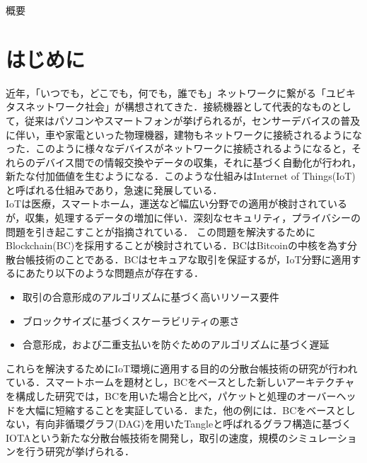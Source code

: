 \documentclass{kuisthesis}			%
\date{平成30年2月1日}				%
\begin{document}
\maketitle

\begin{jabstract}
概要
\end{jabstract}


\tableofcontents

\section{はじめに}\label{sec-intro}

近年，「いつでも，どこでも，何でも，誰でも」ネットワークに繋がる「ユビキタスネットワーク社会」が構想されてきた．接続機器として代表的なものとして，従来はパソコンやスマートフォンが挙げられるが，センサーデバイスの普及に伴い，車や家電といった物理機器，建物もネットワークに接続されるようになった．このように様々なデバイスがネットワークに接続されるようになると，それらのデバイス間での情報交換やデータの収集，それに基づく自動化が行われ，新たな付加価値を生むようになる．このような仕組みはInternet of Things(IoT)と呼ばれる仕組みであり，急速に発展している\cite{Atzori2010}\cite{Gubbi2013}．\\
IoTは医療，スマートホーム，運送など幅広い分野での適用が検討されているが，収集，処理するデータの増加に伴い．深刻なセキュリティ，プライバシーの問題を引き起こすことが指摘されている\cite{dorri2017towards}．
この問題を解決するためにBlockchain(BC)を採用することが検討されている．BCはBitcoin\cite{nakamoto2008bitcoin}の中核を為す分散台帳技術のことである．BCはセキュアな取引を保証するが，IoT分野に適用するにあたり以下のような問題点が存在する．

\begin{itemize}
\setlength{\itemsep}{0cm}
\item 取引の合意形成のアルゴリズムに基づく高いリソース要件
\item ブロックサイズに基づくスケーラビリティの悪さ
\item 合意形成，および二重支払いを防ぐためのアルゴリズムに基づく遅延
\end{itemize}

これらを解決するためにIoT環境に適用する目的の分散台帳技術の研究が行われている．スマートホームを題材とし，BCをベースとした新しいアーキテクチャを構成した研究\cite{dorri2017towards}では，BCを用いた場合と比べ，パケットと処理のオーバーヘッドを大幅に短縮することを実証している．また，他の例には．BCをベースとしない，有向非循環グラフ(DAG)を用いたTangleと呼ばれるグラフ構造に基づくIOTAという新たな分散台帳技術を開発し，取引の速度，規模のシミュレーションを行う研究\cite{popov2016tangle}\cite{kusmierz2017first}が挙げられる．
\end{document}
